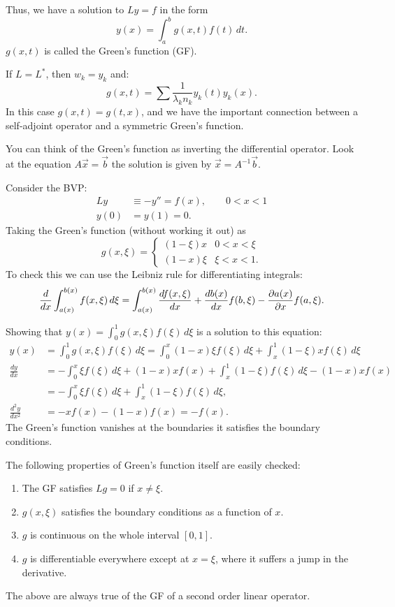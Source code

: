 \documentclass[10pt, a4paper]{article}
\begin{document}
Thus,
we have a solution to $Ly = f$ in the form
\[
y(x) = \int_{a}^{b}g(x, t)f(t)\,dt.
\]
$g(x, t)$ is called the Green's function
(GF).

If $L = L ^ {*}$,
then $w_k = y_k$ and:
\[
g(x, t) = \sum \frac{1}{\lambda_kn_k}y_k(t)y_k(x).
\]
In this case $g(x, t) = g(t, x)$,
and we have the important connection between a self-adjoint operator and a symmetric Green's function.

You can think of the Green's function as inverting the differential operator.
Look at the equation $A\vec{x} = \vec{b}$ the solution is given by $\vec{x} = A ^ {-1}\vec{b}$.

\begin{example}
    Consider the BVP:
    \begin{align*}
        Ly &\equiv -y'' = f(x),\qquad 0 < x < 1 \\
        y(0) &= y(1) = 0.
    \end{align*}
    Taking the Green's function
    (without working it out)
    as
    \[
    g(x, \xi) = \begin{cases}
        (1 - \xi)x & 0 < x < \xi \\
        (1 - x)\xi & \xi < x < 1.
    \end{cases}
    \]
    To check this we can use the Leibniz rule for differentiating integrals:
    \[
    \frac{d}{dx}\int_{a(x)}^{b(x)}f(x, \xi)\,d\xi = \int_{a(x)}^{b(x)}\frac{df(x, \xi)}{dx} + \frac{db(x)}{dx}f(b, \xi) - \pd[a(x)]{x}f(a, \xi).
    \]

    Showing that $y(x) = \int_{0}^{1}g(x, \xi)f(\xi)\,d\xi$ is a solution to this equation:
    \begin{align*}
        y(x) &= \int_{0}^{1}g(x, \xi)f(\xi)\,d\xi = \int_{0}^{x}(1 - x)\xi f(\xi)\,d\xi + \int_{x}^{1}(1 - \xi)xf(\xi)\,d\xi \\
        \frac{dy}{dx} &= -\int_{0}^{x}\xi f(\xi)\,d\xi + (1 - x)xf(x) + \int_{x}^{1}(1 - \xi)f(\xi)\,d\xi - (1 - x)xf(x) \\
        &= -\int_{0}^{x}\xi f(\xi)\,d\xi + \int_{x}^{1}(1 - \xi)f(\xi)\,d\xi, \\
        \frac{d ^ 2y}{dx ^ 2} &= -xf(x) - (1 - x)f(x) = -f(x).
    \end{align*}
    The Green's function vanishes at the boundaries it satisfies the boundary conditions.
\end{example}

The following properties of Green's function itself are easily checked:
\begin{enumerate}[label = (\roman*)]
    \item The GF satisfies $Lg = 0$ if $x \neq \xi$.

    \item $g(x, \xi)$ satisfies the boundary conditions as a function of $x$.

    \item $g$ is continuous on the whole interval $[0, 1]$.

    \item $g$ is differentiable everywhere except at $x = \xi$,
    where it suffers a jump in the derivative.
\end{enumerate}
The above are always true of the GF of a second order linear operator.
\end{document}
